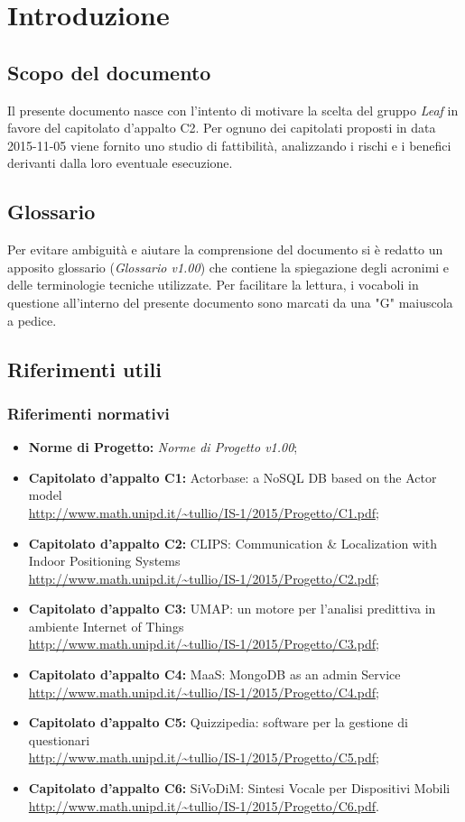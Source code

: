 \documentclass[../nStudioDiFattibilita.tex]{subfiles}
\begin{document}
\section{Introduzione}
	\subsection{Scopo del documento}
	Il presente documento nasce con l'intento di motivare la scelta del gruppo \textit{Leaf} in favore del capitolato d'appalto C2. Per ognuno dei capitolati proposti in data 2015-11-05 viene fornito uno studio di fattibilità, analizzando i rischi e i benefici derivanti dalla loro eventuale esecuzione.
	\subsection{Glossario} \label{sec:Glossario}
	Per evitare ambiguità e aiutare la comprensione del documento si è redatto un apposito glossario (\textit{Glossario v1.00}) che contiene la spiegazione degli acronimi e delle terminologie tecniche utilizzate. Per facilitare la lettura, i vocaboli in questione all'interno del presente documento sono marcati da una "G" maiuscola a pedice.
	\subsection{Riferimenti utili}
		\subsubsection{Riferimenti normativi}
		\begin{itemize}
			\item \textbf{Norme di Progetto:} \textit{Norme di Progetto v1.00};
			\item \textbf{Capitolato d'appalto C1:} Actorbase: a NoSQL DB based on the Actor model \\\url{http://www.math.unipd.it/~tullio/IS-1/2015/Progetto/C1.pdf};
			\item \textbf{Capitolato d'appalto C2:} CLIPS: Communication \& Localization with Indoor Positioning Systems \\\url{http://www.math.unipd.it/~tullio/IS-1/2015/Progetto/C2.pdf};
			\item \textbf{Capitolato d'appalto C3:} UMAP: un motore per l'analisi predittiva in ambiente Internet of Things \\\url{http://www.math.unipd.it/~tullio/IS-1/2015/Progetto/C3.pdf};
			\item \textbf{Capitolato d'appalto C4:} MaaS: MongoDB as an admin Service \\\url{http://www.math.unipd.it/~tullio/IS-1/2015/Progetto/C4.pdf};
			\item \textbf{Capitolato d'appalto C5:} Quizzipedia: software per la gestione di questionari \\\url{http://www.math.unipd.it/~tullio/IS-1/2015/Progetto/C5.pdf};
			\item \textbf{Capitolato d'appalto C6:} SiVoDiM: Sintesi Vocale per Dispositivi Mobili \\\url{http://www.math.unipd.it/~tullio/IS-1/2015/Progetto/C6.pdf}.
		\end{itemize}
\end{document}
